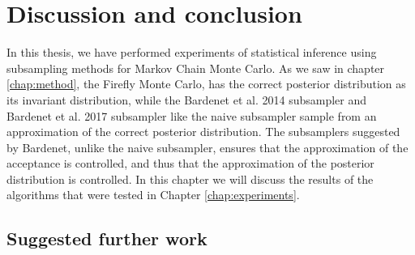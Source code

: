 \chapter{Discussion and conclusion}
In this thesis, we have performed experiments of statistical inference using subsampling methods for Markov Chain Monte Carlo. As we saw in chapter \ref{chap:method}, the Firefly Monte Carlo, has the correct posterior distribution as its invariant distribution, while the Bardenet et al. 2014 subsampler and Bardenet et al. 2017 subsampler like the naive subsampler sample from an approximation of the correct posterior distribution. The subsamplers suggested by Bardenet, unlike the naive subsampler, ensures that the approximation of the acceptance is controlled, and thus that the approximation of the posterior distribution is controlled.  In this chapter we will discuss the results of the algorithms that were tested in Chapter \ref{chap:experiments}. 



\section{Suggested further work}
